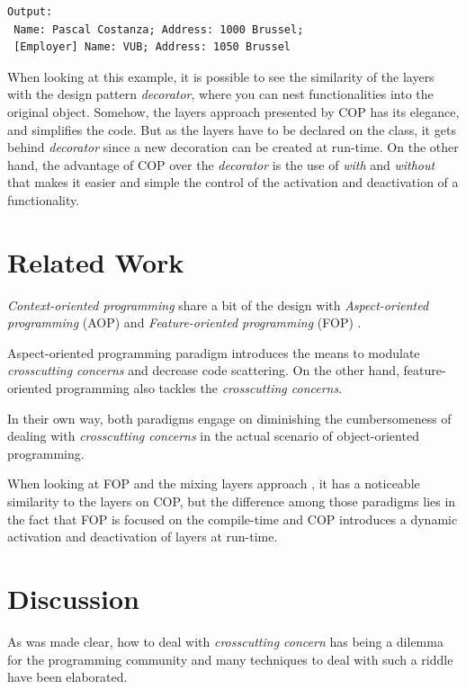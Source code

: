 \documentclass[journal,10pt,compsoc]{IEEEtran}
\begin{document}
\begin{verbatim}
Output:
 Name: Pascal Costanza; Address: 1000 Brussel;
 [Employer] Name: VUB; Address: 1050 Brussel
\end{verbatim}

When looking at this example, it is possible to see the similarity of the layers with the design pattern \emph{decorator}, where you can nest functionalities into
the original object. Somehow, the layers approach presented by COP has its elegance, and simplifies the code. But as the layers have to be declared on the class,
it gets behind \emph{decorator} since a new decoration can be created at run-time. On the other hand, the advantage of COP over the \emph{decorator} is the use of \emph{with} and \emph{without} that makes
it easier and simple the control of the activation and deactivation of a functionality.

\section{Related Work}
\label{sec:org8ebe63d}

\emph{Context-oriented programming} share a bit of the design with \emph{Aspect-oriented programming} (AOP) \cite{kiczales1997aspect} and \emph{Feature-oriented programming} (FOP) \cite{prehofer1997feature}.


Aspect-oriented programming paradigm introduces the means to modulate \emph{crosscutting concerns} and decrease code scattering. On the other hand, feature-oriented programming also tackles the 
\emph{crosscutting concerns}.

In their own way, both paradigms engage on diminishing the cumbersomeness of dealing with \emph{crosscutting concerns} in the actual scenario of object-oriented programming.


When looking at FOP and the mixing layers approach \cite{smaragdakis2002mixin}, it has a noticeable similarity to the layers on COP, but the difference among those paradigms lies
in the fact that FOP is focused on the compile-time and COP introduces a dynamic activation and deactivation of layers at run-time.

\section{Discussion}
\label{sec:org334ba5c}
As was made clear, how to deal with \emph{crosscutting concern} has being a dilemma for the programming community and many techniques to deal with such a riddle have been elaborated.
\end{document}
